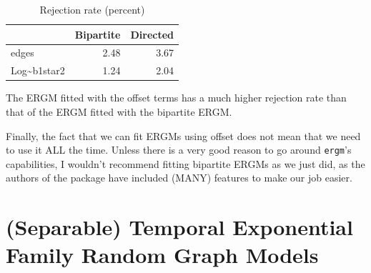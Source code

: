 \documentclass[
]{book}
\newenvironment{Shaded}{\begin{snugshade}}{\end{snugshade}}
\newcommand{\AttributeTok}[1]{\textcolor[rgb]{0.13,0.29,0.53}{#1}}
\newcommand{\DecValTok}[1]{\textcolor[rgb]{0.00,0.00,0.81}{#1}}
\newcommand{\FunctionTok}[1]{\textcolor[rgb]{0.13,0.29,0.53}{\textbf{#1}}}
\newcommand{\NormalTok}[1]{#1}
\newcommand{\SpecialCharTok}[1]{\textcolor[rgb]{0.81,0.36,0.00}{\textbf{#1}}}
\newcommand{\StringTok}[1]{\textcolor[rgb]{0.31,0.60,0.02}{#1}}
\begin{document}
\begin{Shaded}
\end{Shaded}

\begin{table}

\caption{\label{tab:05-example2-post-dist}Rejection rate (percent)}
\centering
\begin{tabular}[t]{l|r|r}
\hline
  & Bipartite & Directed\\
\hline
edges & 2.48 & 3.67\\
\hline
Log\textasciitilde{}b1star2 & 1.24 & 2.04\\
\hline
\end{tabular}
\end{table}

The ERGM fitted with the offset terms has a much higher rejection rate
than that of the ERGM fitted with the bipartite ERGM.

Finally, the fact that we can fit ERGMs using offset does not mean that
we need to use it ALL the time. Unless there is a very good reason to
go around \texttt{ergm}'s capabilities, I wouldn't recommend fitting bipartite
ERGMs as we just did, as the authors of the package have included (MANY)
features to make our job easier.

\hypertarget{separable-temporal-exponential-family-random-graph-models}{%
\chapter{(Separable) Temporal Exponential Family Random Graph Models}\label{separable-temporal-exponential-family-random-graph-models}}
\end{document}
